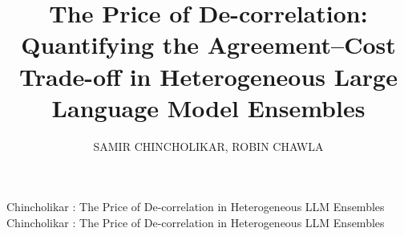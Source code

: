 \documentclass{ieeeaccess}
\begin{document}

\title{The Price of De-correlation: Quantifying the Agreement--Cost Trade-off
in Heterogeneous Large Language Model Ensembles}

\author{\uppercase{Samir Chincholikar},
\uppercase{Robin Chawla}}

\address[1]{Independent Researcher, New York, NY 10007, USA (e-mail: samir.chincholikar@gmail.com, ORCID: 0009-0007-2779-3492; robin.chawla.cse14@iitbhu.ac.in, ORCID: 0009-0007-2807-3948)}

\markboth
{Chincholikar \headeretal: The Price of De-correlation in Heterogeneous LLM Ensembles}
{Chincholikar \headeretal: The Price of De-correlation in Heterogeneous LLM Ensembles}

\end{document}
